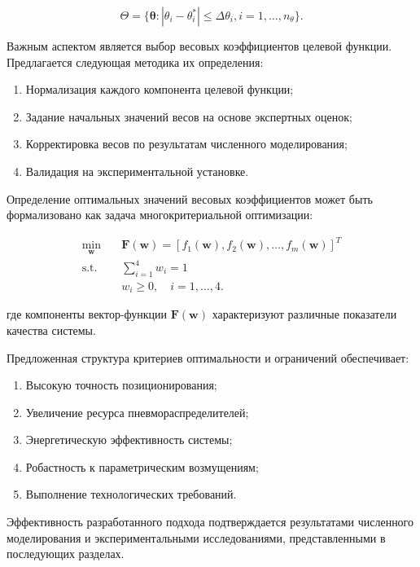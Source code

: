 \begin{equation}
\Theta = \{\boldsymbol{\theta}: |\theta_i - \theta_i^*| \leq \Delta\theta_i, i = 1,\ldots,n_{\theta}\}.
\end{equation}

Важным аспектом является выбор весовых коэффициентов целевой функции. Предлагается следующая методика их определения:

\begin{enumerate}
\item Нормализация каждого компонента целевой функции;
\item Задание начальных значений весов на основе экспертных оценок;
\item Корректировка весов по результатам численного моделирования;
\item Валидация на экспериментальной установке.
\end{enumerate}

Определение оптимальных значений весовых коэффициентов может быть формализовано как задача многокритериальной оптимизации:

\begin{equation}
\begin{aligned}
\min_{\mathbf{w}} \quad & \mathbf{F}(\mathbf{w}) = [f_1(\mathbf{w}), f_2(\mathbf{w}), \ldots, f_m(\mathbf{w})]^T \\
\text{s.t.} \quad & \sum_{i=1}^4 w_i = 1 \\
& w_i \geq 0, \quad i = 1,\ldots,4.
\end{aligned}
\end{equation}

где компоненты вектор-функции $\mathbf{F}(\mathbf{w})$ характеризуют различные показатели качества системы.

Предложенная структура критериев оптимальности и ограничений обеспечивает:

\begin{enumerate}
\item Высокую точность позиционирования;
\item Увеличение ресурса пневмораспределителей;
\item Энергетическую эффективность системы;
\item Робастность к параметрическим возмущениям;
\item Выполнение технологических требований.
\end{enumerate}

Эффективность разработанного подхода подтверждается результатами численного моделирования и экспериментальными
исследованиями, представленными в последующих разделах.

